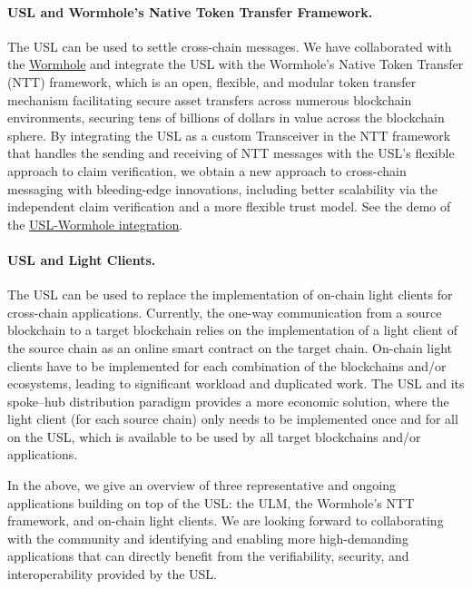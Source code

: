 \documentclass{article}
\newcommand{\ulm}{{ULM}}
\begin{document}
\paragraph{USL and Wormhole's Native Token Transfer Framework.\\}
The USL can be used to settle cross-chain messages. 
We have collaborated with the \href{https://wormhole.com/}{Wormhole}
and integrate the USL with the Wormhole’s Native Token Transfer (NTT) framework,
which is an open, flexible, and modular token transfer mechanism facilitating secure asset transfers across numerous blockchain environments, securing tens of billions of dollars in value across the blockchain sphere.
By integrating the USL as a custom Transceiver in the NTT framework that 
handles the sending and receiving of NTT messages with the USL's flexible approach to claim verification,
we obtain a new approach to cross-chain messaging with bleeding-edge innovations,
including better scalability via the independent claim verification and a more flexible trust model.
See the demo of the \href{https://pi2.network/videos/USL-Wormhole-Devcon-7}{USL-Wormhole integration}. 

\paragraph{USL and Light Clients.\\}

The USL can be used to replace the implementation of on-chain light clients for cross-chain applications. 
Currently, the one-way communication from a source blockchain to a target blockchain relies on the implementation
of a light client of the source chain as an online smart contract on the target chain. 
On-chain light clients have to be implemented for each combination of the blockchains and/or ecosystems, leading to
significant workload and duplicated work. 
The USL and its spoke–hub distribution paradigm provides a more economic solution, 
where the light client (for each source chain) only needs to be implemented once and for all on the USL,
which is available to be used by all target blockchains and/or applications. 

In the above, we give an overview of three representative and ongoing applications building on top of the USL:
the \ulm{}, the Wormhole's NTT framework, and on-chain light clients. 
We are looking forward to collaborating with the community and identifying and enabling more high-demanding 
applications that can directly benefit from the verifiability, security, and interoperability provided by the USL.
\end{document}
